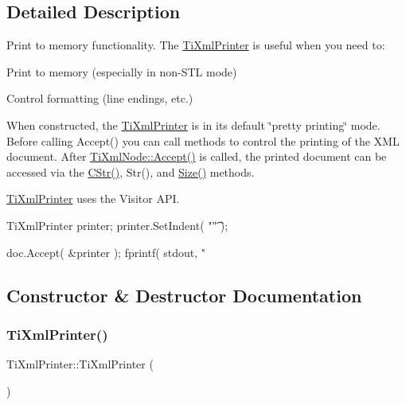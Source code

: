 \subsection{Detailed Description}
Print to memory functionality. The \hyperlink{class_ti_xml_printer}{Ti\+Xml\+Printer} is useful when you need to\+:


\begin{DoxyEnumerate}
\item Print to memory (especially in non-\/\+S\+TL mode)
\item Control formatting (line endings, etc.)
\end{DoxyEnumerate}

When constructed, the \hyperlink{class_ti_xml_printer}{Ti\+Xml\+Printer} is in its default \char`\"{}pretty printing\char`\"{} mode. Before calling Accept() you can call methods to control the printing of the X\+ML document. After \hyperlink{class_ti_xml_node_acc0f88b7462c6cb73809d410a4f5bb86}{Ti\+Xml\+Node\+::\+Accept()} is called, the printed document can be accessed via the \hyperlink{class_ti_xml_printer_a859eede9597d3e0355b77757be48735e}{C\+Str()}, Str(), and \hyperlink{class_ti_xml_printer_ad01375ae9199bd2f48252eaddce3039d}{Size()} methods.

\hyperlink{class_ti_xml_printer}{Ti\+Xml\+Printer} uses the Visitor A\+PI. \begin{DoxyVerb}TiXmlPrinter printer;
printer.SetIndent( "\t" );

doc.Accept( &printer );
fprintf( stdout, "%
\end{DoxyVerb}
 

\subsection{Constructor \& Destructor Documentation}
\mbox{\label{class_ti_xml_printer_a6539b864026c8667cd0bd5fdf4b41f43}} 
\subsubsection{\texorpdfstring{Ti\+Xml\+Printer()}{TiXmlPrinter()}}
{\footnotesize\ttfamily Ti\+Xml\+Printer\+::\+Ti\+Xml\+Printer (\begin{DoxyParamCaption}{ }\end{DoxyParamCaption})\hspace{0.3cm}{\ttfamily [inline]}}



